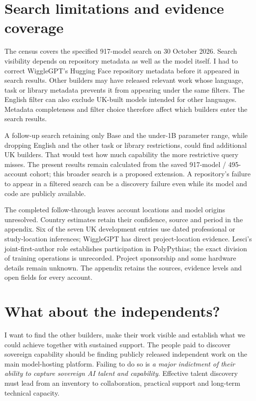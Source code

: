 \documentclass[11pt,a4paper]{article}
\begin{document}
\section{Search limitations and evidence coverage}
The census covers the specified 917-model search on 30 October 2026.
Search visibility depends on repository metadata as well as the model
itself. I had to correct WiggleGPT's Hugging Face repository metadata
before it appeared in search results. Other builders may have released
relevant work whose language, task or library metadata prevents it from
appearing under the same filters. The English filter can also exclude
UK-built models intended for other languages. Metadata completeness and
filter choice therefore affect which builders enter the search results.

A follow-up search retaining only Base and the under-1B parameter range,
while dropping English and the other task or library restrictions, could
find additional UK builders. That would test how much capability the
more restrictive query misses. The present results remain calculated from
the saved 917-model / 495-account cohort; this broader search is a proposed
extension. A repository's failure to appear in a filtered search can be
a discovery failure even while its model and code are publicly available.

The completed follow-through leaves \UnresolvedGeographyAccounts{} account
locations and \UnresolvedProvenanceModels{} model origins unresolved.
Country estimates retain their confidence, source and period in the appendix.
Six of the seven UK development entries use dated professional
or study-location inferences; WiggleGPT has direct project-location evidence.
Lesci's joint-first-author role establishes participation in PolyPythias;
the exact division of training operations is unrecorded. Project sponsorship
and some hardware details remain unknown. The appendix retains the sources,
evidence levels and open fields for every account.

\section{What about the independents?}
I want to find the other builders, make their work visible and establish
what we could achieve together with sustained support. The people paid
to discover sovereign capability should be finding publicly released
independent work on the main model-hosting platform. Failing to do so is
\emph{a major indictment of their ability to capture sovereign AI talent
and capability}. Effective talent discovery must lead from an inventory
to collaboration, practical support and long-term technical capacity.
\end{document}
